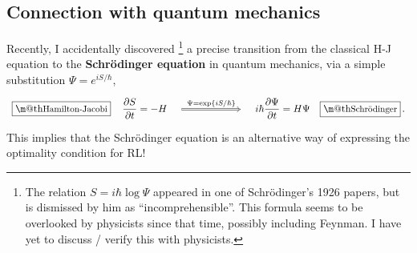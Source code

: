 \documentclass[orivec]{llncs}
\makeatletter
\newcommand{\emp}[1]{\textbf{#1}}
\renewcommand{\boxed}[1]{\fbox{\m@th$\displaystyle\scalebox{0.9}{#1}$} \,}
\makeatother
\begin{document}
\subsection{Connection with quantum mechanics}
\label{sec:quantum}

Recently, I accidentally discovered \cite{Yan2019}
\footnote{The relation $S = i \hbar \log \Psi$ appeared in one of Schr\"{o}dinger's 1926 papers, but is dismissed by him as ``incomprehensible''.  This formula seems to be overlooked by physicists since that time, possibly including Feynman.  I have yet to discuss / verify this with physicists.}
a precise transition from the classical H-J equation to the \emp{Schr\"{o}dinger equation} in quantum mechanics, via a simple substitution $\Psi = e^{i S / \hbar}$,
\begin{equation}
\begin{tikzcd}[column sep = 6em]
\boxed{\mbox{Hamilton-Jacobi}} \quad \displaystyle \frac{\partial S}{\partial t} = - H \quad
\arrow[Rightarrow, r, "$\Psi = \exp \{ i S / \hbar \} $", align=center]
& \quad \displaystyle i \hbar \frac{\partial \Psi}{\partial t} = H \Psi \quad \boxed{\mbox{Schr\"{o}dinger}} .
\end{tikzcd}
\end{equation} 
This implies that the Schr\"{o}dinger equation is an alternative way of expressing the optimality condition for RL!




\end{document}
